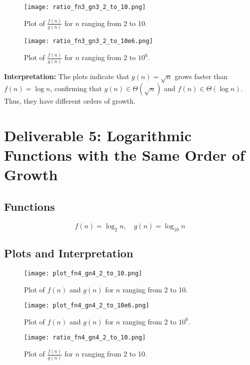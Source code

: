 \documentclass{article}
\begin{document}
\begin{figure}[H]
    \centering
    \texttt{[image: ratio\_fn3\_gn3\_2\_to\_10.png]}
    \caption{Plot of $\frac{f(n)}{g(n)}$ for $n$ ranging from 2 to 10.}
    \label{fig:ratio_fn3_gn3_2_10}
\end{figure}

\begin{figure}[H]
    \centering
    \texttt{[image: ratio\_fn3\_gn3\_2\_to\_10e6.png]}
    \caption{Plot of $\frac{f(n)}{g(n)}$ for $n$ ranging from 2 to $10^6$.}
    \label{fig:ratio_fn3_gn3_2_10e6}
\end{figure}

\textbf{Interpretation:} The plots indicate that $g(n) = \sqrt{n}$ grows faster than $f(n) = \log n$, confirming that $g(n) \in \Theta(\sqrt{n})$ and $f(n) \in \Theta(\log n)$. Thus, they have different orders of growth.

\section{Deliverable 5: Logarithmic Functions with the Same Order of Growth}

\subsection{Functions}
\[
f(n) = \log_2 n, \quad g(n) = \log_{10} n
\]

\subsection{Plots and Interpretation}

\begin{figure}[H]
    \centering
    \texttt{[image: plot\_fn4\_gn4\_2\_to\_10.png]}
    \caption{Plot of $f(n)$ and $g(n)$ for $n$ ranging from 2 to 10.}
    \label{fig:fn4_gn4_2_10}
\end{figure}

\begin{figure}[H]
    \centering
    \texttt{[image: plot\_fn4\_gn4\_2\_to\_10e6.png]}
    \caption{Plot of $f(n)$ and $g(n)$ for $n$ ranging from 2 to $10^6$.}
    \label{fig:fn4_gn4_2_10e6}
\end{figure}

\begin{figure}[H]
    \centering
    \texttt{[image: ratio\_fn4\_gn4\_2\_to\_10.png]}
    \caption{Plot of $\frac{f(n)}{g(n)}$ for $n$ ranging from 2 to 10.}
    \label{fig:ratio_fn4_gn4_2_10}
\end{figure}
\end{document}
